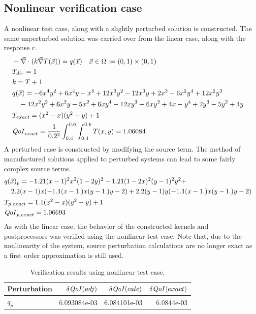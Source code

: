 \documentclass{article}
\newcommand{\vx}{\vec{x}}
\renewcommand{\div}{\vec{\nabla} \cdot}
\newcommand{\grad}{\vec{\nabla}}
\newcommand{\qoi}{{\it QoI}\xspace}
\newcommand{\Tdir}{T_{dir}}
\begin{document}
\subsection{Nonlinear verification case} A nonlinear test case, along with a slightly perturbed solution is constructed. The same unperturbed solution was carried over from the linear case, along with the response $r$. 
\begin{equation}
\label{case0}
\begin{split}
& - \div ( k \grad T(\vx) ) = q(\vx) \quad \vx \in \Omega := (0,1) \times (0,1) \\
&\Tdir=1 \\
& k = T+1 \\
& q(\vx) = -6 x^4 y^2 + 6 x^4 y - x^4 + 12 x^3 y^2 - 12 x^3 y + 2 x^3 - 6 x^2 y^4 + 12 x^2 y^3  \\
& \quad -12 x^2 y^2 + 6 x^2 y - 5 x^2 + 6 x y^4 - 12 x y^3 + 6 x y^2 + 4 x - y^4 + 2 y^3 - 5 y^2 + 4 y \\
& T_{exact}=(x^2-x)(y^2-y)+1\\
& \qoi_{exact} = \frac{1}{0.2^2} \int_{0.4}^{0.6} \int_{0.4}^{0.6} T(x,y) = 1.06084
\end{split}
\end{equation}
A perturbed case is constructed by modifying the source term. The method of manufactured solutions applied to perturbed systems can lead to some fairly complex source terms.
\begin{equation}
\begin{split}
& q(\vx)_p =  -1.21 (x - 1)^2 x^2 (1 - 2 y)^2 - 1.21 (1 - 2 x)^2 (y - 1)^2 y^2 + \\
& \quad 2.2 (x - 1) x (-1.1 (x - 1.) x (y - 1.) y - 2) + 2.2 (y - 1) y (-1.1 (x - 1.) x (y - 1.) y - 2) \\
& T_{p,exact}=1.1(x^2-x)(y^2-y)+1\\
& \qoi_{p,exact} = 1.06693
\end{split}
\end{equation}
As with the linear case, the behavior of the constructed kernels and postprocessors was verified using the nonlinear test case. Note that, due to the nonlinearity of the system, source perturbation calculations are no longer exact as a first order approximation is still used.
\begin{table}[H]
\centering
  \begin{tabular}{| l | r | r | r |}
    \hline
    Perturbation  &  $\delta \qoi (adj)$ & $\delta \qoi (calc)$ & $\delta \qoi (exact)$ \\ \hline
     $q_p $ &   6.093084e-03 & 6.084101e-03  & 6.0844e-03 \\ \hline
    \end{tabular}
  \caption{Verification results using nonlinear test case.}
\end{table}
\end{document}
